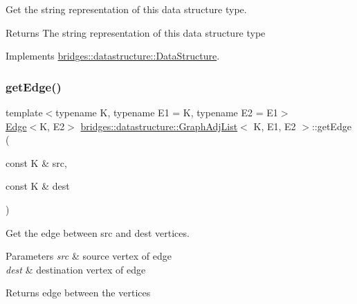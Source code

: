 Get the string representation of this data structure type. 

\begin{DoxyReturn}{Returns}
The string representation of this data structure type 
\end{DoxyReturn}


Implements \hyperlink{classbridges_1_1datastructure_1_1_data_structure_a4ff66cb34409f11fe9fc647f6d8a22ce}{bridges\+::datastructure\+::\+Data\+Structure}.

\mbox{\label{classbridges_1_1datastructure_1_1_graph_adj_list_a2d8ff5a971516d05ff07bb1c3b73e405}} 
\subsubsection{\texorpdfstring{get\+Edge()}{getEdge()}}
{\footnotesize\ttfamily template$<$typename K, typename E1 = K, typename E2 = E1$>$ \\
\hyperlink{classbridges_1_1datastructure_1_1_edge}{Edge}$<$K, E2$>$ \hyperlink{classbridges_1_1datastructure_1_1_graph_adj_list}{bridges\+::datastructure\+::\+Graph\+Adj\+List}$<$ K, E1, E2 $>$\+::get\+Edge (\begin{DoxyParamCaption}\item[{const K \&}]{src,  }\item[{const K \&}]{dest }\end{DoxyParamCaption})\hspace{0.3cm}{\ttfamily [inline]}}



Get the edge between src and dest vertices. 


\begin{DoxyParams}{Parameters}
{\em src} & source vertex of edge \\
\hline
{\em dest} & destination vertex of edge \\
\hline
\end{DoxyParams}
\begin{DoxyReturn}{Returns}
edge between the vertices 
\end{DoxyReturn}
\mbox{\label{classbridges_1_1datastructure_1_1_graph_adj_list_ab56ec428deb9a5bc4499f42bbd710b1a}} 
